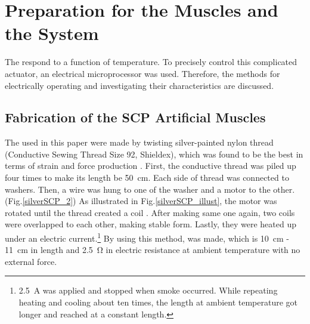 \section{Preparation for the Muscles and the System}\label{section_preparation}
The \scps respond to a function of temperature. To precisely control this complicated actuator, an electrical microprocessor was used. Therefore, the methods for electrically operating \scps and investigating their characteristics are discussed.

\subsection{Fabrication of the SCP Artificial Muscles}
The \scps used in this paper were made by twisting silver-painted nylon thread (Conductive Sewing Thread Size 92, Shieldex), which was found to be the best in terms of strain and force production \cite{haines}. First, the conductive thread was piled up four times to make its length be \SI{50}{\centi\meter}. Each side of thread was connected to washers. Then, a wire was hung to one of the washer and a motor to the other. (Fig.\ref{silverSCP_2})
As illustrated in Fig.\ref{silverSCP_illust}, the motor was rotated until the thread created a coil \cite{fab_coil}. After making same one again, two coils were overlapped to each other, making stable form. 
Lastly, they were heated up under an electric current.\footnote{\SI{2.5}{\ampere} was applied and stopped when smoke occurred. While repeating heating and cooling about ten times, the length at ambient temperature got longer and reached at a constant length.} By using this method, \scp was made, which is \SI{10}{\centi\meter} - \SI{11}{\centi\meter} in length and \SI{2.5}{\ohm} in electric resistance at ambient temperature with no external force.

